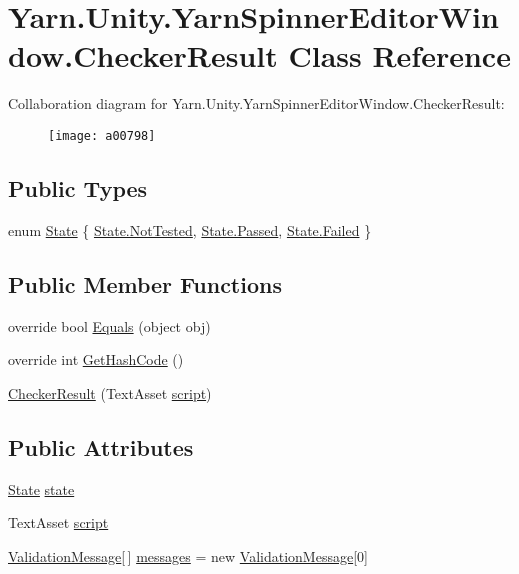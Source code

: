 \hypertarget{a00051}{\section{Yarn.\-Unity.\-Yarn\-Spinner\-Editor\-Window.\-Checker\-Result Class Reference}
\label{a00051}
}


Collaboration diagram for Yarn.\-Unity.\-Yarn\-Spinner\-Editor\-Window.\-Checker\-Result\-:
\nopagebreak
\begin{figure}[H]
\begin{center}
\leavevmode
\texttt{[image: a00798]}
\end{center}
\end{figure}
\subsection*{Public Types}
\begin{DoxyCompactItemize}
\item 
enum \hyperlink{a00051_ab24848d7951ce44eb3c7768c6ee10385}{State} \{ \hyperlink{a00051_ab24848d7951ce44eb3c7768c6ee10385a0197c47523ba5a2bdfef705786687de5}{State.\-Not\-Tested}, 
\hyperlink{a00051_ab24848d7951ce44eb3c7768c6ee10385aa0d0628f6b4e4d78d2ffef4d4d1c4b15}{State.\-Passed}, 
\hyperlink{a00051_ab24848d7951ce44eb3c7768c6ee10385ad7c8c85bf79bbe1b7188497c32c3b0ca}{State.\-Failed}
 \}
\end{DoxyCompactItemize}
\subsection*{Public Member Functions}
\begin{DoxyCompactItemize}
\item 
override bool \hyperlink{a00051_a1e653caad5ab99847c26ff8f67da8f45}{Equals} (object obj)
\item 
override int \hyperlink{a00051_a85d50993390cdd8ba30ac44043b18de7}{Get\-Hash\-Code} ()
\item 
\hyperlink{a00051_af1c9b3d1757d33ad2141c639c3827c97}{Checker\-Result} (Text\-Asset \hyperlink{a00051_a6c852f7521c0a91b519aa3d391f63e6b}{script})
\end{DoxyCompactItemize}
\subsection*{Public Attributes}
\begin{DoxyCompactItemize}
\item 
\hyperlink{a00051_ab24848d7951ce44eb3c7768c6ee10385}{State} \hyperlink{a00051_a7202b24bd068da24d7e28bec5668b13a}{state}
\item 
Text\-Asset \hyperlink{a00051_a6c852f7521c0a91b519aa3d391f63e6b}{script}
\item 
\hyperlink{a00188_a00386}{Validation\-Message}\mbox{[}$\,$\mbox{]} \hyperlink{a00051_a808a039e280cf875cb3c9e9385148498}{messages} = new \hyperlink{a00188_a00386}{Validation\-Message}\mbox{[}0\mbox{]}
\end{DoxyCompactItemize}


